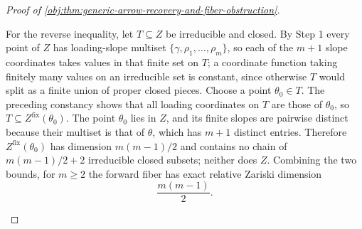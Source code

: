 \documentclass[11pt]{article}
\begin{document}
\begin{proof}[Proof of \cref{obj:thm:generic-arrow-recovery-and-fiber-obstruction}]
\begin{enumerate}
For the reverse inequality, let \(T\subseteq Z\) be irreducible and closed.  By Step 1 every point of \(Z\) has loading-slope multiset \(\{\gamma,\rho_1,\ldots,\rho_m\}\), so each of the \(m+1\) slope coordinates takes values in that finite set on \(T\); a coordinate function taking finitely many values on an irreducible set is constant, since otherwise \(T\) would split as a finite union of proper closed pieces.  Choose a point \(\theta_0\in T\).  The preceding constancy shows that all loading coordinates on \(T\) are those of \(\theta_0\), so \(T\subseteq Z^{\mathrm{fix}}(\theta_0)\).  The point \(\theta_0\) lies in \(Z\), and its finite slopes are pairwise distinct because their multiset is that of \(\theta\), which has \(m+1\) distinct entries.  Therefore \(Z^{\mathrm{fix}}(\theta_0)\) has dimension \(m(m-1)/2\) and contains no chain of \(m(m-1)/2+2\) irreducible closed subsets; neither does \(Z\).  Combining the two bounds, for \(m\ge2\) the forward fiber has exact relative Zariski dimension
\[
\frac{m(m-1)}{2}.
\]


\end{enumerate}
\end{proof}
\end{document}
